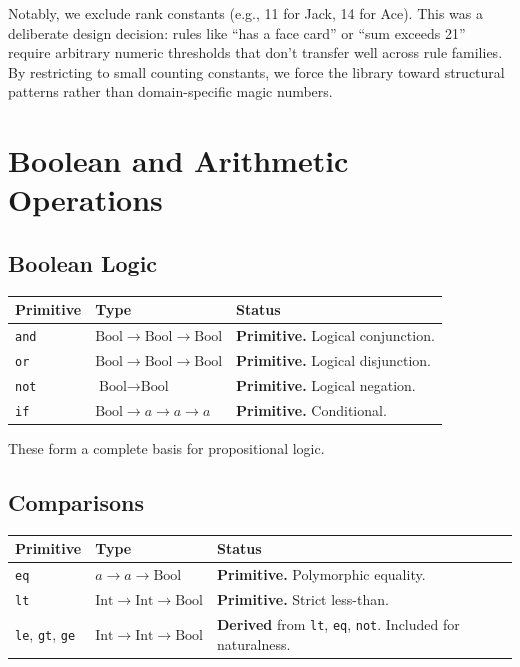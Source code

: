 \documentclass[11pt]{article}
\begin{document}
Notably, we exclude rank constants (e.g., 11 for Jack, 14 for Ace). This was a deliberate design decision: rules like ``has a face card'' or ``sum exceeds 21'' require arbitrary numeric thresholds that don't transfer well across rule families. By restricting to small counting constants, we force the library toward structural patterns rather than domain-specific magic numbers.

\section{Boolean and Arithmetic Operations}

\subsection{Boolean Logic}

\begin{center}
\begin{tabular}{llp{7cm}}
\toprule
\textbf{Primitive} & \textbf{Type} & \textbf{Status} \\
\midrule
\texttt{and} & $\text{Bool} \to \text{Bool} \to \text{Bool}$ & \textbf{Primitive.} Logical conjunction. \\
\texttt{or} & $\text{Bool} \to \text{Bool} \to \text{Bool}$ & \textbf{Primitive.} Logical disjunction. \\
\texttt{not} & $\text{Bool} \to \text{Bool}$ & \textbf{Primitive.} Logical negation. \\
\texttt{if} & $\text{Bool} \to a \to a \to a$ & \textbf{Primitive.} Conditional. \\
\bottomrule
\end{tabular}
\end{center}

These form a complete basis for propositional logic.

\subsection{Comparisons}

\begin{center}
\begin{tabular}{llp{7cm}}
\toprule
\textbf{Primitive} & \textbf{Type} & \textbf{Status} \\
\midrule
\texttt{eq} & $a \to a \to \text{Bool}$ & \textbf{Primitive.} Polymorphic equality. \\
\texttt{lt} & $\text{Int} \to \text{Int} \to \text{Bool}$ & \textbf{Primitive.} Strict less-than. \\
\texttt{le}, \texttt{gt}, \texttt{ge} & $\text{Int} \to \text{Int} \to \text{Bool}$ & \textbf{Derived} from \texttt{lt}, \texttt{eq}, \texttt{not}. Included for naturalness. \\
\bottomrule
\end{tabular}
\end{center}
\end{document}
